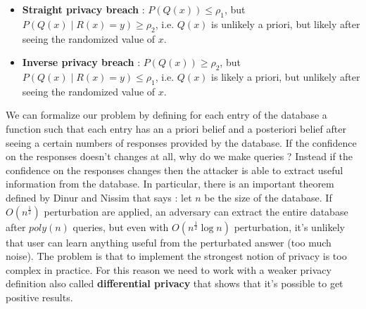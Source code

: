 \begin{itemize}
\item \textbf{Straight privacy breach} : $P(Q(x)) \leq \rho_{1}$, but $P(Q(x) \mid R(x) = y) \geq \rho_{2}$, i.e. $Q(x)$ is unlikely a priori, but likely after seeing the randomized value of $x$.
\item \textbf{Inverse privacy breach} : $P(Q(x)) \geq \rho_{2}$, but $P(Q(x) \mid R(x) = y) \leq \rho_{1}$, i.e. $Q(x)$ is likely a priori, but unlikely after seeing the randomized value of $x$.
\end{itemize}
We can formalize our problem by defining for each entry of the database a function such that each entry has an a priori belief and a posteriori belief after seeing a certain numbers of responses provided by the database. If the confidence on the responses doesn't changes at all, why do we make queries ? Instead if the confidence on the responses changes then the attacker is able to extract useful information from the database. In particular, there is an important theorem defined by Dinur and Nissim that says : let $n$ be the size of the database. If $O(n^{\frac{1}{2}})$ perturbation are applied, an adversary can extract the entire database after $poly(n)$ queries, but even with $O(n^{\frac{1}{2}} \log n)$ perturbation, it's unlikely that user can learn anything useful from the perturbated answer (too much noise). The problem is that to implement the strongest notion of privacy is too complex in practice. For this reason we need to work with a weaker privacy definition also called \textbf{differential privacy} that shows that it's possible to get positive results.

